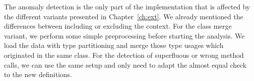 The anomaly detection is the only part of the implementation that is affected by the different variants presented in Chapter~\ref{ch:ext}.
We already mentioned the differences between including or excluding the context.
For the class merge variant, we perform some simple preprocessing before starting the analysis.
We load the data with type partitioning and merge those type usages which originated in the same class.
For the detection of superfluous or wrong method calls, we can use the same setup and only need to adapt the almost equal check to the new definitions.

